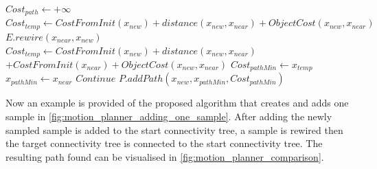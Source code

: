 \begin{algorithm}[H]
\begin{algorithmic}[1]
{{\hspace{-0.1cm}\colorbox{my_green}{\parbox{\linewidth}{%
    \State $Cost_{path} \leftarrow +\infty$ 
        \State $Cost_{temp} \leftarrow CostFromInit(x_{new}) + distance(x_{new}, x_{near}) + ObjectCost(x_{new}, x_{near})$
              \State $E.rewire(x_{near}, x_{new})$
           \EndIf
        \EndIf
      \Else {}
          \State $Cost_{temp} \leftarrow CostFromInit(x_{new}) + distance(x_{new}, x_{near}) $ \newline\hspace*{10em} $+ CostFromInit(x_{near}) + ObjectCost(x_{new}, x_{near})$
                  \State $Cost_{pathMin} \leftarrow x_{temp}$
                  \State $x_{pathMin} \leftarrow x_{near}$
              \EndIf
          \EndIf
      \EndIf
          \State $Continue$
      \Else
          \State $P.addPath(x_{new}, x_{pathMin}, Cost_{pathMin})$
      \EndIf
    \EndFor
}}

\EndWhile
}}
\end{algorithmic}
\end{algorithm}

\newpage
Now an example is provided of the proposed algorithm that creates and adds one sample in \cref{fig:motion_planner_adding_one_sample}. After adding the newly sampled sample is added to the start connectivity tree, a sample is rewired then the target connectivity tree is connected to the start connectivity tree. The resulting path found can be visualised in \cref{fig:motion_planner_comparison}.\bs

